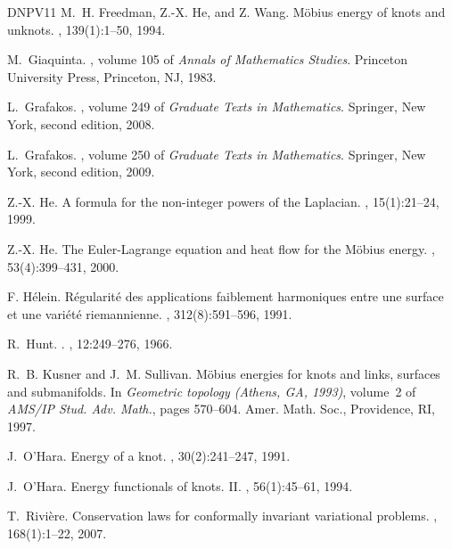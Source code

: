\begin{thebibliography}{DNPV11}
M.~H. Freedman, Z.-X. He, and Z. Wang.
\newblock M\"obius energy of knots and unknots.
, 139(1):1--50, 1994.

M.~Giaquinta.
, volume 105 of {\em Annals of Mathematics Studies}.
\newblock Princeton University Press, Princeton, NJ, 1983.

L.~Grafakos.
, volume 249 of {\em Graduate Texts
  in Mathematics}.
\newblock Springer, New York, second edition, 2008.

L.~Grafakos.
, volume 250 of {\em Graduate Texts in
  Mathematics}.
\newblock Springer, New York, second edition, 2009.

Z.-X. He.
\newblock A formula for the non-integer powers of the {L}aplacian.
, 15(1):21--24, 1999.

Z.-X. He.
\newblock The {E}uler-{L}agrange equation and heat flow for the {M}\"obius
  energy.
, 53(4):399--431, 2000.

F. H{\'e}lein.
\newblock R\'egularit\'e des applications faiblement harmoniques entre une
  surface et une vari\'et\'e riemannienne.
, 312(8):591--596, 1991.

R.~Hunt.
.
, 12:249--276, 1966.

R.~B. Kusner and J.~M. Sullivan.
\newblock M\"obius energies for knots and links, surfaces and submanifolds.
\newblock In {\em Geometric topology ({A}thens, {GA}, 1993)}, volume~2 of {\em
  AMS/IP Stud. Adv. Math.}, pages 570--604. Amer. Math. Soc., Providence, RI,
  1997.

J.~O'Hara.
\newblock Energy of a knot.
, 30(2):241--247, 1991.

J.~O'Hara.
\newblock Energy functionals of knots. {II}.
, 56(1):45--61, 1994.

T.~Rivi{\`e}re.
\newblock Conservation laws for conformally invariant variational problems.
, 168(1):1--22, 2007.


\end{thebibliography}
